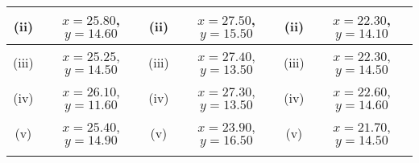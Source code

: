 \documentclass[12pt]{article}
\begin{document}
\begin{tabular}{||c|c||c|c||c|c||}
					\hline (ii)  & $x= 25.80$, $y = 14.60$  & (ii) & $x= 27.50 $, $y= 15.50$ & (ii) & $x= 22.30$, $y = 14.10$ \\  \hline
					\hline (iii) & $x= 25.25$, $y= 14.50 $   & (iii) & $x= 27.40$, $y= 13.50$ &(iii) & $x= 22.30$, $y= 14.50$ \\  \hline
					\hline (iv)  & $x= 26.10$, $y = 11.60$  & (iv) & $x= 27.30$, $y= 13.50$ & (iv)  & $x= 22.60 $, $y = 14.60$\\  \hline
					\hline (v) & $x= 25.40$, $y = 14.90$ & (v)  & $x= 23.90$, $y = 16.50 $ & (v) & $x= 21.70$, $y= 14.50$\\  \hline
					\hline
					& & & & & \\ \hline
				\end{tabular}
			
\end{document}
